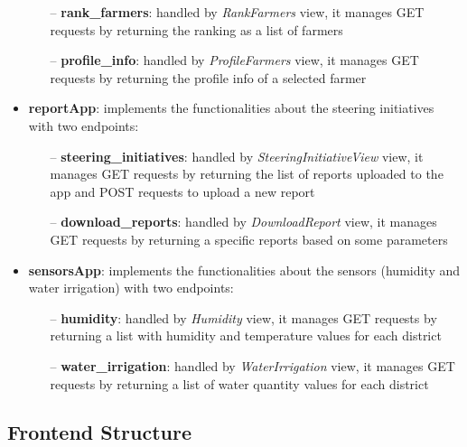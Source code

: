 \documentclass[table, 12pt]{article}
\begin{document}
\begin{itemize}
\begin{itemize}
        \item[--] \textbf{rank\_farmers}: handled by \textit{RankFarmers} view, it manages GET requests by returning the ranking as a list of farmers
        \item[--] \textbf{profile\_info}: handled by \textit{ProfileFarmers} view, it manages GET requests by returning the profile info of a selected farmer
    \end{itemize}
    \item \textbf{reportApp}: implements the functionalities about the steering initiatives with two endpoints:
    \begin{itemize}
        \item[--] \textbf{steering\_initiatives}: handled by \textit{SteeringInitiativeView} view, it manages GET requests by returning the list of reports uploaded to the app and POST requests to upload a new report
        \item[--] \textbf{download\_reports}: handled by \textit{DownloadReport} view, it manages GET requests by returning a specific reports based on some parameters
    \end{itemize}
    \item \textbf{sensorsApp}: implements the functionalities about the sensors (humidity and water irrigation) with two endpoints:
    \begin{itemize}
        \item[--] \textbf{humidity}: handled by \textit{Humidity} view, it manages GET requests by returning a list with humidity and temperature values for each district
        \item[--] \textbf{water\_irrigation}: handled by \textit{WaterIrrigation} view, it manages GET requests by returning a list of water quantity values for each district
    \end{itemize}
\end{itemize}

\subsection{Frontend Structure}
\end{document}
